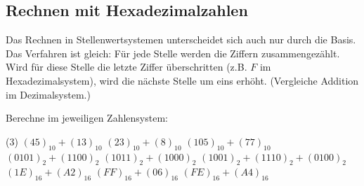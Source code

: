 \documentclass[10pt, a4paper]{scrartcl}
\begin{document}
\subsection*{Rechnen mit Hexadezimalzahlen}
Das Rechnen in Stellenwertsystemen unterscheidet sich auch nur durch die Basis. Das Verfahren ist gleich: Für jede Stelle werden die Ziffern zusammengezählt. Wird für diese Stelle die letzte Ziffer überschritten (z.B. $F$ im Hexadezimalsystem), wird die nächste Stelle um eins erhöht. (Vergleiche Addition im Dezimalsystem.)

\begin{aufgabe}
	Berechne im jeweiligen Zahlensystem:
	\begin{tasks}(3)
		\task $(45)_{10} + (13)_{10}$ \task $(23)_{10} + (8)_{10}$ \task $(105)_{10} + (77)_{10}$
		\task $(0101)_{2} + (1100)_{2}$ \task $(1011)_{2} + (1000)_{2}$ \task $(1001)_{2} + (1110)_{2} + (0100)_{2}$
		\task $(1E)_{16} + (A2)_{16}$ \task $(FF)_{16} + (06)_{16}$ \task $(FE)_{16} + (A4)_{16}$
	\end{tasks}
\end{aufgabe}
\end{document}
